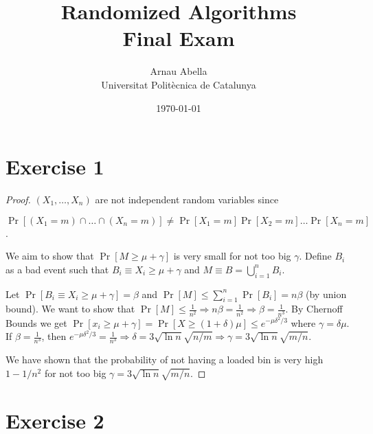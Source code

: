 \documentclass[12pt, a4paper]{article} %
\title{%
  \vspace{-6em}
  Randomized Algorithms\\
  \large{Final Exam}
}
\author{%
  Arnau Abella \\
  \large{Universitat Polit\`ecnica de Catalunya}
}
\date{\today}
\newcommand{\pr}[1]{\Pr[#1]}
\begin{document}
\maketitle



\section*{Exercise 1}
\label{sec:1}

\begin{proof}
  $(X_1, \ldots, X_n)$ are not independent random variables since

  \quad ${}\pr{(X_1 = m) \cap \ldots \cap (X_{n} = m)} \neq \pr{X_{1} = m}\pr{X_{2} = m} \ldots \pr{X_{n} = m}$.

We aim to show that $\pr{M \geq \mu + \gamma}$ is very small for not too big $\gamma$.
Define $B_{i}$ as a bad event such that $B_{i} \equiv X_{i} \geq \mu + \gamma$ and $M \equiv B = \bigcup_{i = 1}^{n} B_{i}$.

  Let $\pr{B_{i} \equiv X_{i} \geq \mu + \gamma} = \beta$ and ${\pr{M} \leq \sum_{i=1}^{n} \pr{B_{i}} = n\beta}$ (by union bound). We want to show that $\pr{M} \leq \frac{1}{n^{2}} \Rightarrow n\beta = \frac{1}{n^{2}} \Rightarrow \beta = \frac{1}{n^{3}}$. By Chernoff Bounds we get ${\pr{x_{i} \geq \mu + \gamma} = \pr{X \geq (1 + \delta)\mu} \leq e^{-\mu\delta^{2} / 3}}$ where ${\gamma = \delta \mu}$. If $\beta = \frac{1}{n^{3}}$, then $e^{-\mu \delta^{2} / 3} = \frac{1}{n^{3}} \Rightarrow {\delta = 3\sqrt{\ln n}\sqrt{n/m}} \Rightarrow {\gamma = 3\sqrt{\ln n}\sqrt{m/n}}$.

We have shown that the probability of not having a loaded bin is very high $1 - 1/n^{2}$ for not too big ${\gamma = 3\sqrt{\ln n}\sqrt{m/n}}$.
\end{proof}


\section*{Exercise 2}
\label{sec:2}
\end{document}
